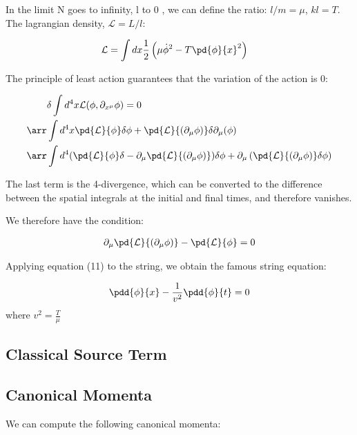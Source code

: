 In the limit N goes to infinity, l to 0 , we can define the ratio: \(l/m = \mu\), \(kl = T\).
The lagrangian density, \(\mathcal{L} = L/l\):

\begin{align}
    & \mathcal{L} = \int dx  \frac12 \left(\mu \dot{\phi}^2 - T \pd{\phi}{x}^2 \right)
\end{align}


The principle of least action guarantees that the variation of the action is 0:

\newcommand{\La}{\mathcal L}
\newcommand{\Ha}{\mathcal H}

\begin{align}
    &\delta \int d^4 x \mathcal{L}(\phi, \partial_{x^\mu}{\phi}) = 0 \\
    \arr & \int d^4 x \pd{\La}{\phi} \delta \phi + \pd{\La}{(\partial_\mu \phi)} \delta \partial_\mu(\phi) \\
    \arr & \int d^4 (\pd{\La}{\phi} \delta - \partial_\mu \pd{\La}{(\partial_\mu \phi)}) \delta \phi 
    + \partial_\mu \left(\pd{\La}{(\partial_\mu \phi)} \delta \phi \right)
\end{align}

The last term is the 4-divergence, which can be converted to the difference between the spatial integrals
at the initial and final times, and therefore vanishes.

We therefore have the condition:

\begin{align}
    \partial_\mu \pd{\La}{(\partial_\mu \phi)} - \pd{\La}{\phi} = 0
\end{align}

Applying equation (11) to the string, we obtain the famous string equation:

\begin{align}
    \pdd{\phi}{x}-\frac{1}{v^2}\pdd{\phi}{t} = 0
\end{align}
where \(v^2 = \frac{T}{\mu}\)

\subsection{Classical Source Term}

\subsection{Canonical Momenta}

We can compute the following canonical momenta:

